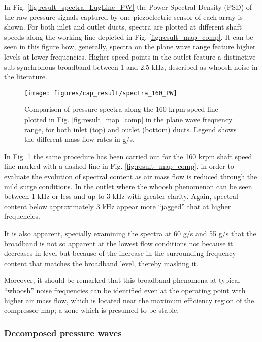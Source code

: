 In Fig. \ref{fig:result_spectra_LugLine_PW} the Power Spectral Density (PSD) of the raw pressure signals captured by one piezoelectric sensor of each array is shown. For both inlet and outlet ducts, spectra are plotted at different shaft speeds along the working line depicted in Fig. \ref{fig:result_map_comp}. It can be seen in this figure how, generally, spectra on the plane wave range feature higher levels at lower frequencies. Higher speed points in the outlet feature a distinctive sub-synchronous broadband between 1 and 2.5 kHz, described as whoosh noise in the literature.

\begin{figure}[tbh!]
\centering
\texttt{[image: figures/cap\_result/spectra\_160\_PW]}
\caption{Comparison of pressure spectra along the 160 krpm speed line plotted in Fig. \ref{fig:result_map_comp} in the plane wave frequency range, for both inlet (top) and outlet (bottom) ducts. Legend shows the different mass flow rates in g/s.}
\label{fig:result_spectra_60_PW}
\end{figure}

In Fig. \ref{fig:result_spectra_60_PW} the same procedure has been carried out for the 160 krpm shaft speed line marked with a dashed line in Fig. \ref{fig:result_map_comp}, in order to evaluate the evolution of spectral content as air mass flow is reduced through the mild surge conditions. In the outlet where the whoosh phenomenon can be seen between 1 kHz or less and up to 3 kHz with greater clarity. Again, spectral content below approximately 3 kHz appear more ``jagged'' that at higher frequencies.

It is also apparent, specially examining the spectra at 60 g/s and 55 g/s that the broadband is not so apparent at the lowest flow conditions not because it decreases in level but because of the increase in the surrounding frequency content that matches the broadband level, thereby masking it. 

Moreover, it should be remarked that this broadband phenomena at typical ``whoosh'' noise frequencies can be identified even at the operating point with higher air mass flow, which is located near the maximum efficiency region of the compressor map; a zone which is presumed to be stable.

\subsubsection{Decomposed pressure waves}

